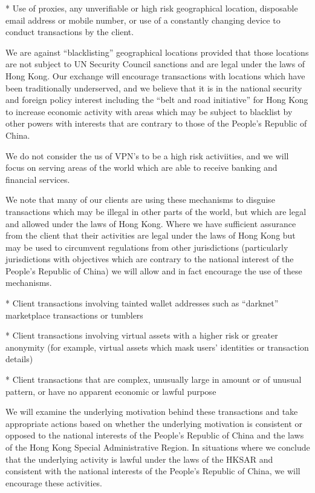 * Use of proxies, any unverifiable or high risk geographical location,
disposable email address or mobile number, or use of a constantly
changing device to conduct transactions by the client.

We are against ``blacklisting'' geographical locations provided that
those locations are not subject to UN Security Council sanctions and
are legal under the laws of Hong Kong.  Our exchange will encourage
transactions with locations which have been traditionally underserved,
and we believe that it is in the national security and foreign policy
interest including the ``belt and road initiative'' for Hong Kong to
increase economic activity with areas which may be subject to
blacklist by other powers with interests that are contrary to those of
the People's Republic of China.

We do not consider the us of VPN's to be a high risk activiities, and
we will focus on serving areas of the world which are able to receive
banking and financial services.

We note that many of our clients are using these mechanisms to
disguise transactions which may be illegal in other parts of the
world, but which are legal and allowed under the laws of Hong Kong.
Where we have sufficient assurance from the client that their
activities are legal under the laws of Hong Kong but may be used to
circumvent regulations from other jurisdictions (particularly
jurisdictions with objectives which are contrary to the national
interest of the People's Republic of China) we will allow and in fact
encourage the use of these mechanisms.

* Client transactions involving tainted wallet addresses such as
“darknet” marketplace transactions or tumblers

* Client transactions involving virtual assets with a higher risk or
greater anonymity (for example, virtual assets which mask users’
identities or transaction details)

* Client transactions that are complex, unusually large in amount or
of unusual pattern, or have no apparent economic or lawful purpose

We will examine the underlying motivation behind these transactions
and take appropriate actions based on whether the underlying
motivation is consistent or opposed to the national interests of the
People's Republic of China and the laws of the Hong Kong Special
Administrative Region.  In situations where we conclude that the
underlying activity is lawful under the laws of the HKSAR and
consistent with the national interests of the People's Republic of
China, we will encourage these activities.

